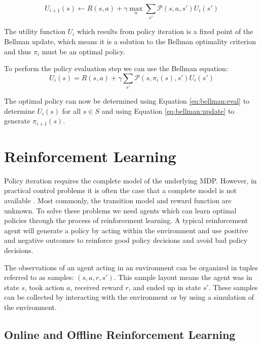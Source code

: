 \begin{equation}
    U_{i+1}(s) \gets R(s,a) + \gamma \max_a \sum_{s'}\mathcal{P}(s,a,s')U_i(s')
    \label{eq:bellman:update}
\end{equation}

The utility function $U_i$ which results from policy iteration is a fixed point of the Bellman update, which means it is a solution to the Bellman optimality criterion and thus $\pi_i$ must be an optimal policy.

To perform the policy evaluation step we can use the Bellman equation:
\begin{equation}
    U_i(s) = R(s,a) + \gamma \sum_{s'} \mathcal{P}(s, \pi_i(s), s')U_i(s')
    \label{eq:bellman:eval}
\end{equation}

The optimal policy can now be determined using Equation \ref{eq:bellman:eval} to determine $U_i(s)$ for all $s \in S$ and using Equation \ref{eq:bellman:update} to generate $\pi_{i+1}(s)$.

\section{Reinforcement Learning}

Policy iteration requires the complete model of the underlying MDP. However, in practical control problems it is often the case that a complete model is not available \cite{lspi}. Most commonly, the transition model and reward function are unknown. To solve these problems we need agents which can learn optimal policies through the process of reinforcement learning. A typical reinforcement agent will generate a policy by acting within the environment and use positive and negative outcomes to reinforce good policy decisions and avoid bad policy decisions.

The observations of an agent acting in an environment can be organized in tuples referred to as samples: $(s, a, r, s')$. This sample layout means the agent was in state $s$, took action $a$, received reward $r$, and ended up in state $s'$. These samples can be collected by interacting with the environment or by using a simulation of the environment.

\subsection{Online and Offline Reinforcement Learning}

